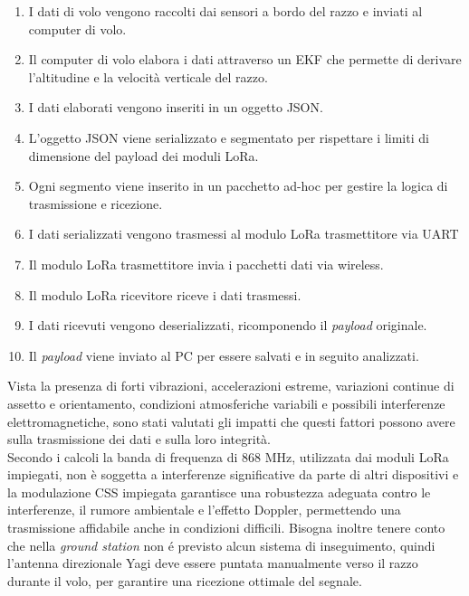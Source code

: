 \documentclass[12pt,a4paper,twoside]{book}
\begin{document}
\begin{enumerate}
    \item I dati di volo vengono raccolti dai sensori a bordo del razzo e inviati al computer di volo.
    \item Il computer di volo elabora i dati attraverso un \ac{EKF} che permette di derivare l'altitudine e la velocità verticale del razzo.
    \item I dati elaborati vengono inseriti in un oggetto JSON.
    \item L'oggetto JSON viene serializzato e segmentato per rispettare i limiti di dimensione del payload dei moduli \ac{LoRa}.
    \item Ogni segmento viene inserito in un pacchetto ad-hoc per gestire la logica di trasmissione e ricezione.
    \item I dati serializzati vengono trasmessi al modulo \ac{LoRa} trasmettitore via \ac{UART}
    \item Il modulo \ac{LoRa} trasmettitore invia i pacchetti dati via wireless.
    \item Il modulo \ac{LoRa} ricevitore riceve i dati trasmessi.
    \item I dati ricevuti vengono deserializzati, ricomponendo il \emph{payload} originale.
    \item Il \emph{payload} viene inviato al PC per essere salvati e in seguito analizzati.
\end{enumerate}
Vista la presenza di forti vibrazioni, accelerazioni estreme,
variazioni continue di assetto e orientamento, condizioni atmosferiche variabili
e possibili interferenze elettromagnetiche, sono stati valutati
gli impatti che questi fattori possono avere sulla trasmissione dei dati e sulla
loro integrità. \\
Secondo i calcoli la banda di frequenza di 868 MHz, utilizzata dai moduli
\ac{LoRa} impiegati, non è soggetta a interferenze significative da parte di altri
dispositivi e la modulazione \ac{CSS} impiegata garantisce una robustezza
adeguata contro le interferenze, il rumore ambientale e l'effetto Doppler,
permettendo una trasmissione affidabile anche in condizioni difficili.
Bisogna inoltre tenere conto che nella \emph{ground station} non \'e previsto
alcun sistema di inseguimento, quindi l'antenna direzionale Yagi deve essere puntata manualmente
verso il razzo durante il volo, per garantire una ricezione ottimale del segnale.
\end{document}
